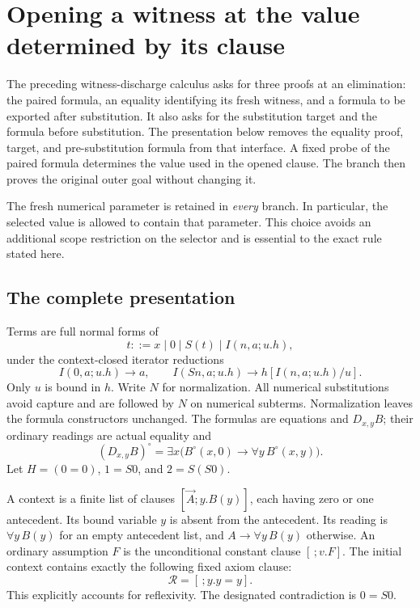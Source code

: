 \documentclass[11pt,letterpaper]{article}
\theoremstyle{definition}
\begin{document}
\section{Opening a witness at the value determined by its clause}
\label{ao:main}

The preceding witness-discharge calculus asks for three proofs at an
elimination: the paired formula, an equality identifying its fresh witness,
and a formula to be exported after substitution.  It also asks for the
substitution target and the formula before substitution.  The presentation
below removes the equality proof, target, and pre-substitution formula from
that interface.  A fixed probe of the paired formula determines the value
used in the opened clause.  The branch then proves the original outer goal
without changing it.

The fresh numerical parameter is retained in \emph{every} branch.  In
particular, the selected value is allowed to contain that parameter.  This
choice avoids an additional scope restriction on the selector and is
essential to the exact rule stated here.

\subsection{The complete presentation}

Terms are full normal forms of
\[
 t::=x\mid0\mid S(t)\mid I(n,a;u.h),
\]
under the context-closed iterator reductions
\[
 I(0,a;u.h)\longrightarrow a,
 \qquad
 I(Sn,a;u.h)\longrightarrow h[I(n,a;u.h)/u].
\]
Only $u$ is bound in $h$.  Write $N$ for normalization.  All numerical
substitutions avoid capture and are followed by $N$ on numerical subterms.
Normalization leaves the formula constructors unchanged.  The formulas
are equations and $D_{x,y}B$; their ordinary readings are actual equality
and
\[
 (D_{x,y}B)^\circ
     =\exists x\bigl(B^\circ(x,0)\to\forall y\,B^\circ(x,y)\bigr).
\]
Let $H=(0=0)$, $1=S0$, and $2=S(S0)$.

A context is a finite list of clauses $[\vec A;y.B(y)]$, each having
zero or one antecedent.  Its bound variable $y$ is absent from the
antecedent.  Its reading is $\forall y\,B(y)$ for an empty antecedent
list, and $A\to\forall y\,B(y)$ otherwise.  An ordinary assumption $F$
is the unconditional constant clause $[\,;v.F]$.  The initial context
contains exactly the following fixed axiom clause:
\[
                 \mathcal R=[\,;y.y=y].
 \tag{Ax}\label{ao:axiom}
\]
This explicitly accounts for reflexivity.  The designated contradiction is
$0=S0$.
\end{document}
